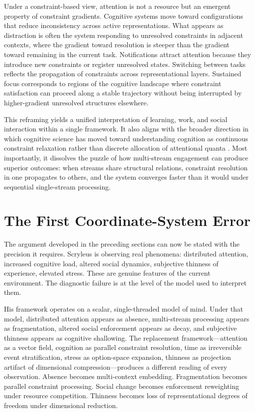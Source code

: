 \documentclass[12pt, a4paper]{article}
\begin{document}
Under a constraint-based view, attention is not a resource but an emergent property of constraint gradients. Cognitive systems move toward configurations that reduce inconsistency across active representations. What appears as distraction is often the system responding to unresolved constraints in adjacent contexts, where the gradient toward resolution is steeper than the gradient toward remaining in the current task. Notifications attract attention because they introduce new constraints or register unresolved states. Switching between tasks reflects the propagation of constraints across representational layers. Sustained focus corresponds to regions of the cognitive landscape where constraint satisfaction can proceed along a stable trajectory without being interrupted by higher-gradient unresolved structures elsewhere.

This reframing yields a unified interpretation of learning, work, and social interaction within a single framework. It also aligns with the broader direction in which cognitive science has moved toward understanding cognition as continuous constraint relaxation rather than discrete allocation of attentional quanta \cite{Friston2010}. Most importantly, it dissolves the puzzle of how multi-stream engagement can produce superior outcomes: when streams share structural relations, constraint resolution in one propagates to others, and the system converges faster than it would under sequential single-stream processing.

\section{The First Coordinate-System Error}

The argument developed in the preceding sections can now be stated with the precision it requires. Scryleus is observing real phenomena: distributed attention, increased cognitive load, altered social dynamics, subjective thinness of experience, elevated stress. These are genuine features of the current environment. The diagnostic failure is at the level of the model used to interpret them.

His framework operates on a scalar, single-threaded model of mind. Under that model, distributed attention appears as absence, multi-stream processing appears as fragmentation, altered social enforcement appears as decay, and subjective thinness appears as cognitive shallowing. The replacement framework---attention as a vector field, cognition as parallel constraint resolution, time as irreversible event stratification, stress as option-space expansion, thinness as projection artifact of dimensional compression---produces a different reading of every observation. Absence becomes multi-context embedding. Fragmentation becomes parallel constraint processing. Social change becomes enforcement reweighting under resource competition. Thinness becomes loss of representational degrees of freedom under dimensional reduction.
\end{document}
